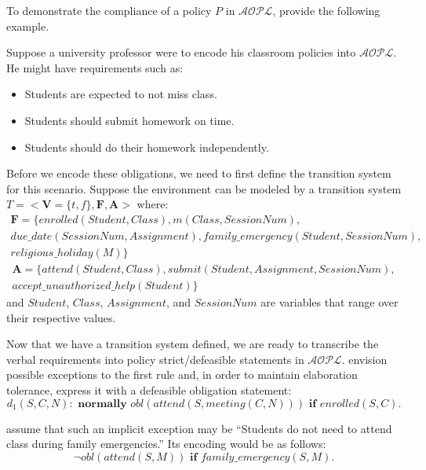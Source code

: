 To demonstrate the compliance of a policy $P$ in $\mathcal{AOPL}$, \citet{gelfond_authorization_2008} provide the following example.

Suppose a university professor were to encode his classroom policies into $\mathcal{AOPL}$.
He might have requirements such as:

\begin{itemize}
    \item Students are expected to not miss class.
    \item Students should submit homework on time.
    \item Students should do their homework independently.
\end{itemize}

Before we encode these obligations, we need to first define the transition system for this scenario.
Suppose the environment can be modeled by a transition system $T=<\boldsymbol{V}=\{t,f\}, \boldsymbol{F}, \boldsymbol{A}>$ where:
\begin{multline}
    \boldsymbol{F} = \{enrolled(Student, Class), m(Class, SessionNum), \\
        due\_date(SessionNum, Assignment), family\_emergency(Student, SessionNum), \\
        religious\_holiday(M)\}
\end{multline}
\begin{multline}
    \boldsymbol{A} = \{attend(Student, Class), submit(Student, Assignment, SessionNum), \\
        accept\_unauthorized\_help(Student)\}
\end{multline}
and $Student$, $Class$, $Assignment$, and $SessionNum$ are variables that range over their respective values.

Now that we have a transition system defined, we are ready to transcribe the verbal requirements into policy strict/defeasible statements in $\mathcal{AOPL}$.
\citet{gelfond_authorization_2008} envision possible exceptions to the first rule and, in order to maintain elaboration tolerance, express it with a defeasible obligation statement:
\begin{equation}
    d_1(S,C,N): \textbf{ normally } obl(attend(S, meeting(C, N))) \textbf{ if } enrolled(S, C).
\end{equation}

\citet{gelfond_authorization_2008} assume that such an implicit exception may be ``Students do not need to attend class during family emergencies.''
Its encoding would be as follows:
\begin{equation}
    \neg obl(attend(S,M)) \textbf{ if } family\_emergency(S,M).
\end{equation}

